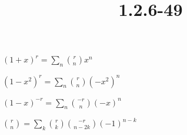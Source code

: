 \documentclass{article}
\title{1.2.6-49}
\begin{document}
\maketitle

$(1+x)^r = \sum_{n} \binom{r}{n}x^n$

$(1-x^2)^r = \sum_{n} \binom{r}{n} (-x^2)^n$

$(1-x)^{-r} = \sum_{n} \binom{-r}{n} (-x)^n$

$\binom{r}{n} = \sum_k \binom{r}{k}\binom{-r}{n-2k}(-1)^{n-k}$
\end{document}

